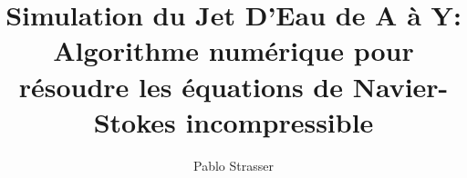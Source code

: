 \usepackage{amsmath,amssymb}
\usepackage{amsthm}


\usepackage{tikz}
\usepackage[francais]{babel}
\usepackage{pgfplots}
\usepackage{pgfplotstable}
\usepackage{subcaption}
%  
\usetikzlibrary{fit}
\usetikzlibrary{backgrounds}
\usetikzlibrary{positioning} 
\usetikzlibrary{shapes.multipart}
\usetikzlibrary{fit}

\newtheorem{property}{Property}

\newcommand{\vect}[1]{ {\boldsymbol {#1}}}
\newcommand{\eye}{1}
\newcommand{\kron}{\bigotimes}

 \beamerdefaultoverlayspecification{}

\newenvironment{plusenv}{\alt{\setbeamertemplate{itemize item}{$\textcolor{green}{\oplus}$}}
{\setbeamertemplate{itemize item}{$\textcolor{gray}{\oplus}$}}}{}
\newenvironment{moinsenv}{\alt{\setbeamertemplate{itemize item}{$\textcolor{red}{\ominus}$}}
{\setbeamertemplate{itemize item}{$\textcolor{gray}{\ominus}$}}}{}
\def\plusitem{\item<+-| plus@+-| handout:plus@0-> }
\def\moinsitem{\item<+-| moins@+-| handout:moins@0-> }

\newenvironment{pmenv}{\alt{\setbeamertemplate{itemize item}{$\textcolor{blue}{\pm}$}}
{\setbeamertemplate{itemize item}{$\textcolor{gray}{\pm}$}}}{}
\def\pmitem{\item<+-| pm@+-| handout:pm@0-> }



\pgfplotsset{compat=1.6}

\title[Navier-Stokes]{Simulation du Jet D'Eau de A à Y:\\ Algorithme numérique pour résoudre les équations de Navier-Stokes incompressible}


\author{Pablo Strasser}





